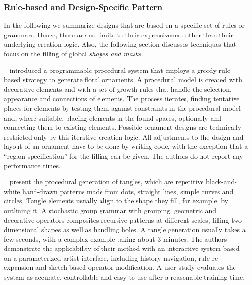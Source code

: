  

\subsubsection{Rule-based and Design-Specific Pattern}
\label{subsubsec:analysis_rulebased_and_designspecific}

In the following we summarize designs that are based on a specific set of rules or grammars. Hence, there are no limits to their expressiveness other than their underlying creation logic. Also, the following section discusses techniques that focus on the filling of global \textit{shapes and masks}.



\citeauthor*{wong_1998_cgf}~\cite{wong_1998_cgf} introduced a programmable procedural system that employs a greedy rule-based strategy to generate floral ornaments. A procedural model is created with decorative elements and with a set of growth rules that handle the selection, appearance and connections of elements. The process iterates, finding tentative places for elements by testing them against constraints in the procedural model and, where suitable, placing elements in the found spaces, optionally and connecting them to existing elements. Possible ornament designs are technically restricted only by this iterative creation logic. All adjustments to the design and layout of an ornament have to be done by writing code, with the exception that a ``region specification'' for the filling can be given. The authors do not report any performance times.

\citeauthor*{santoni_2016_ggp}~\cite{santoni_2016_ggp} present the procedural generation of tangles, which are repetitive black-and-white hand-drawn patterns made from dots, straight lines, simple curves and circles. Tangle elements usually align to the shape they fill, for example, by outlining it. A stochastic group grammar with grouping, geometric and decorative operators composites recursive patterns at different scales, filling two-dimensional shapes as well as handling holes. A tangle generation usually takes a few seconds, with a complex example taking about 3 minutes. The authors demonstrate the applicability of their method with an interactive system based on a parameterized artist interface, including history navigation, rule re-expansion and sketch-based operator modification. A user study evaluates the system as accurate, controllable and easy to use after a reasonable training time.

